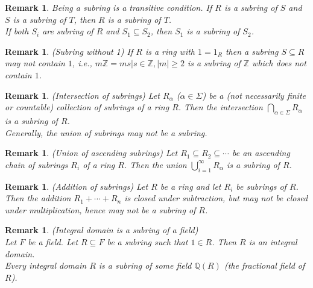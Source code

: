 \documentclass[a4paper,8pt]{article}
\newcommand{\hlt}[1]{\textit{{\color{blue}#1}}}
\theoremstyle{theorem}
\newtheorem{remark}[theorem]{Remark}
\begin{document}
\begin{remark}
Being a subring is a transitive condition. If $R$ is a subring of $S$ and $S$ is a subring of $T$, then $R$ is a subring of $T$.\\
If both $S_i$ are subring of $R$ and $S_1 \subseteq S_2$, then $S_1$ is a subring of $S_2$.\\
\end{remark}


\begin{remark}
\hlt{(Subring without 1)} If $R$ is a ring with $1 = 1_R$ then a subring $S \subseteq R$ may not contain $1$, i.e., $m\mathbb{Z} = {ms|s\in \mathbb{Z}, \left| m \right| \geq 2}$ is a subring of $\mathbb{Z}$ which does not contain $1$.
\end{remark}


\begin{remark}
\hlt{(Intersection of subrings)} Let $R_\alpha$ ($\alpha \in \Sigma$) be a (not necessarily finite or countable) collection of subrings of a ring $R$. Then the intersection $\bigcap\limits_{\alpha \in \Sigma} R_\alpha$ is a subring of $R$.\\
Generally, the union of subrings may not be a subring.\\
\end{remark}


\begin{remark}
\hlt{(Union of ascending subrings)} Let $R_1 \subseteq R_2 \subseteq \cdots $ be an ascending chain of subrings $R_i$ of a ring $R$.
Then the union $\bigcup\limits_{i=1}^{\infty} R_\alpha$ is a subring of $R$.\\
\end{remark}


\begin{remark}
\hlt{(Addition of subrings)} Let $R$ be a ring and let $R_i$ be subrings of $R$.\\
Then the addition $R_1 + \cdots + R_n$ is closed under subtraction, but may not be closed under multiplication, hence may not be a subring of $R$.\\
\end{remark}


\begin{remark}
\hlt{(Integral domain is a subring of a field)}\\
Let $F$ be a field. Let $R \subseteq F$ be a subring such that $1 \in R$. Then $R$ is an integral domain.\\
Every integral domain $R$ is a subring of some field $\mathbb{Q}(R)$ (the fractional field of $R$).\\
\end{remark}
\end{document}

